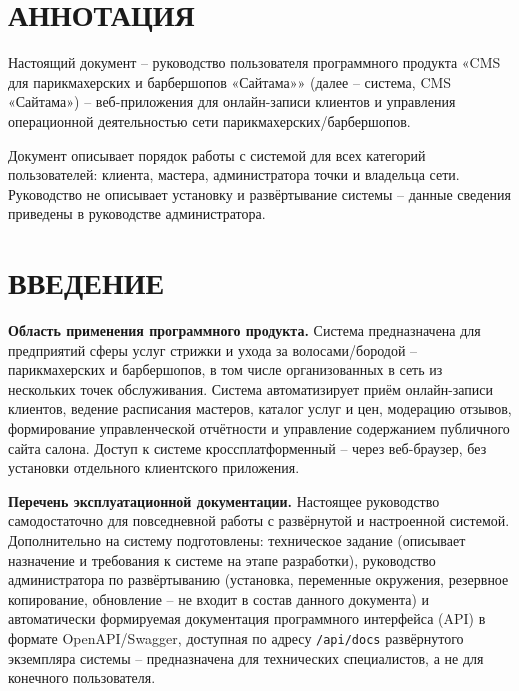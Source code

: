 \section*{АННОТАЦИЯ}

Настоящий документ -- руководство пользователя программного продукта
«CMS для парикмахерских и барбершопов «Сайтама»» (далее -- система,
CMS «Сайтама») -- веб-приложения для онлайн-записи клиентов и управления
операционной деятельностью сети парикмахерских/барбершопов.

Документ описывает порядок работы с системой для всех категорий
пользователей: клиента, мастера, администратора точки и владельца сети.
Руководство не описывает установку и развёртывание системы --
данные сведения приведены в руководстве администратора.

\newpage
\tableofcontents
\newpage

\section*{ВВЕДЕНИЕ}

\textbf{Область применения программного продукта.} Система предназначена
для предприятий сферы услуг стрижки и ухода за волосами/бородой --
парикмахерских и барбершопов, в том числе организованных в сеть из
нескольких точек обслуживания. Система автоматизирует приём онлайн-записи
клиентов, ведение расписания мастеров, каталог услуг и цен, модерацию
отзывов, формирование управленческой отчётности и управление содержанием
публичного сайта салона. Доступ к системе кроссплатформенный -- через
веб-браузер, без установки отдельного клиентского приложения.

\textbf{Перечень эксплуатационной документации.} Настоящее руководство
самодостаточно для повседневной работы с развёрнутой и настроенной
системой. Дополнительно на систему подготовлены: техническое задание
(описывает назначение и требования к системе на этапе разработки),
руководство администратора по развёртыванию (установка, переменные
окружения, резервное копирование, обновление -- не входит в состав
данного документа) и автоматически формируемая документация
программного интерфейса (API) в формате OpenAPI/Swagger, доступная по
адресу \texttt{/api/docs} развёрнутого экземпляра системы -- предназначена
для технических специалистов, а не для конечного пользователя.

